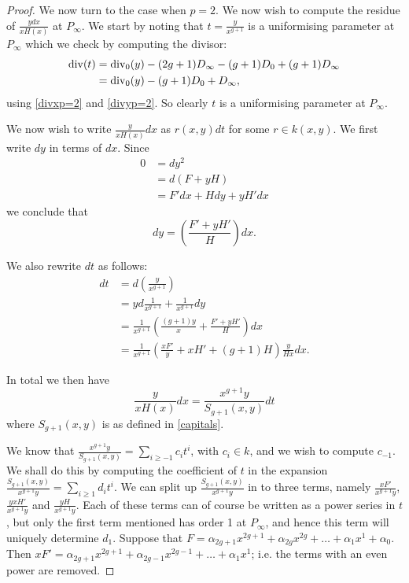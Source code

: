 \begin{proof}
We now turn to the case when $p=2$.
We now wish to compute the residue of $\frac{ydx}{xH(x)}$ at $P_\infty$.
We start by noting that $t = \frac{y}{x^{g+1}}$ is a uniformising parameter at $P_\infty$ which we check by computing the divisor:
\begin{align*}
\operatorname{div}(t) & = \operatorname{div}_0(y) - (2g+1)D_\infty -(g+1)D_0 + (g+1)D_\infty \\
& = \operatorname{div}_0(y)-(g+1)D_0 + D_\infty,
\end{align*}
using \eqref{divxp=2} and \eqref{divyp=2}.
So clearly $t$ is a uniformising parameter at $P_\infty$.

We now wish to write $\frac{y}{xH(x)}dx$ as $r(x,y)dt$ for some $r \in k(x,y)$.
We first write $dy$ in terms of $dx$.
Since
\begin{align*}
0 & =  dy^2 \\
& =  d(F+yH) \\
& =  F'dx + Hdy + yH'dx
\end{align*}
we conclude that
\[
dy = \left( \frac{F'+yH'}{H} \right) dx.
\]

We also rewrite $dt$ as follows:
\begin{align*}
dt & =  d\left( \frac{y}{x^{g+1}} \right) \\
& =  yd\frac{1}{x^{g+1}} + \frac{1}{x^{g+1}}dy \\
& =  \frac{1}{x^{g+1}} \left( \frac{(g+1)y}{x} + \frac{F'+yH'}{H} \right) dx \\
& =  \frac{1}{x^{g+1}} \left( \frac{xF'}{y} + xH' + (g+1)H \right) \frac{y}{Hx} dx.
\end{align*}

In total we then have
\[
\frac{y}{xH(x)}dx = \frac{x^{g+1}y}{S_{g+1}(x,y)}dt
\]
where $S_{g+1}(x,y)$ is as defined in \eqref{capitals}.

We know that $\frac{x^{g+1}y}{S_{g+1}(x,y)} = \sum_{i\geq -1} c_i t^i$, with $c_i \in k$, and we wish to compute $c_{-1}$.
We shall do this by computing the coefficient of $t$ in the expansion $\frac{S_{g+1}(x,y)}{x^{g+1}y} = \sum_{i\geq 1}d_it^i$.
We can split up $\frac{S_{g+1}(x,y)}{x^{g+1}y}$ in to three terms, namely $\frac{xF'}{x^{g+1}y}$, $\frac{yxH'}{x^{g+1}y}$ and $\frac{yH}{x^{g+1}y}$.
Each of these terms can of course be written as a power series in $t$, but only the first term mentioned has order 1 at $P_\infty$, and hence this term will uniquely determine $d_1$.
Suppose that $F = \alpha_{2g+1}x^{2g+1} + \alpha_{2g}x^{2g} + \ldots + \alpha_1x^1 + \alpha_0$.
Then $xF'= \alpha_{2g+1}x^{2g+1} + \alpha_{2g-1}x^{2g-1} + \ldots + \alpha_1x^1$; i.e. the terms with an even power are removed.


\end{proof}
